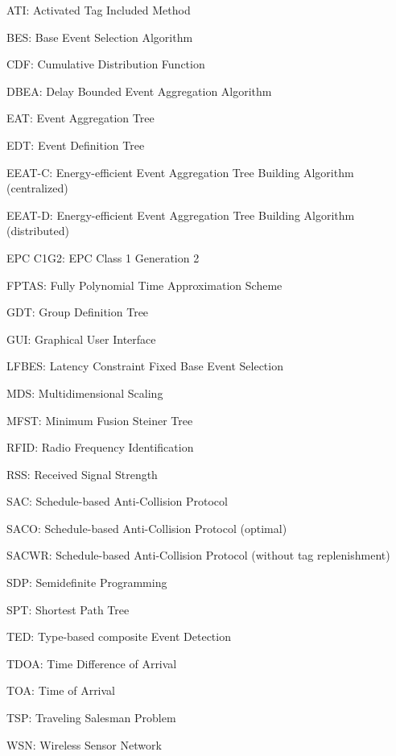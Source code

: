 
\begin{abbreviation}

ATI: Activated Tag Included Method

BES: Base Event Selection Algorithm

CDF: Cumulative Distribution Function

DBEA: Delay Bounded Event Aggregation Algorithm

EAT: Event Aggregation Tree

EDT: Event Definition Tree

EEAT-C: Energy-efficient Event Aggregation Tree Building Algorithm (centralized)

EEAT-D: Energy-efficient Event Aggregation Tree Building Algorithm (distributed)

EPC C1G2: EPC Class 1 Generation 2

FPTAS: Fully Polynomial Time Approximation Scheme

GDT: Group Definition Tree

GUI: Graphical User Interface

LFBES: Latency Constraint Fixed Base Event Selection

MDS: Multidimensional Scaling

MFST: Minimum Fusion Steiner Tree

RFID: Radio Frequency Identification

RSS: Received Signal Strength

SAC: Schedule-based Anti-Collision Protocol

SACO: Schedule-based Anti-Collision Protocol (optimal)

SACWR: Schedule-based Anti-Collision Protocol (without tag replenishment)

SDP: Semidefinite Programming

SPT: Shortest Path Tree

TED: Type-based composite Event Detection

TDOA: Time Difference of Arrival

TOA: Time of Arrival

TSP: Traveling Salesman Problem

WSN: Wireless Sensor Network

\end{abbreviation}



